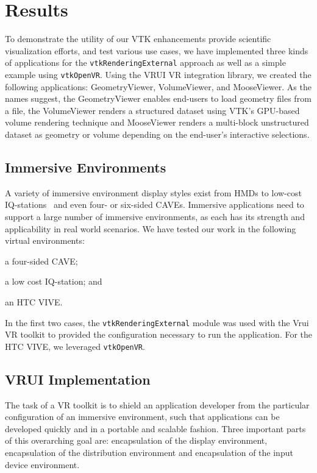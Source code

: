 \section{Results}

To demonstrate the utility of our VTK enhancements provide scientific
visualization efforts, and test various use cases, we have implemented three kinds of
applications for the \texttt{vtkRenderingExternal} approach as well as
a simple example using \texttt{vtkOpenVR}.
Using the VRUI VR integration library, we created the following applications:
GeometryViewer, VolumeViewer, and MooseViewer.
As the names suggest, the GeometryViewer enables end-users to load geometry files from a file, the VolumeViewer renders a structured dataset using VTK's GPU-based volume rendering technique and MooseViewer renders a multi-block unstructured dataset as geometry or volume depending on the end-user's interactive selections.

\subsection{Immersive Environments}

A variety of immersive environment display styles exist from HMDs to low-cost IQ-stations~\cite{Sherman:2010} and even four- or six-sided CAVEs. Immersive applications need to support a large number of immersive environments, as each has its strength and applicability in real world scenarios. We have tested our work in the following virtual environments: 

\begin{compactitem}
\item a four-sided CAVE;
\item a low cost IQ-station; and 
\item an HTC VIVE.
\end{compactitem}

In the first two cases, the \texttt{vtkRenderingExternal} module was used with the Vrui VR toolkit to provided the configuration necessary to run the application. For the HTC VIVE, we leveraged \texttt{vtkOpenVR}. 

\subsection{VRUI Implementation}

The task of a VR toolkit is to shield an application developer from the particular configuration of an immersive environment, such that applications can be developed quickly and in a portable and scalable fashion. Three important parts of this overarching goal are: encapsulation of the display environment, encapsulation of the distribution environment and encapsulation of the input device environment.

